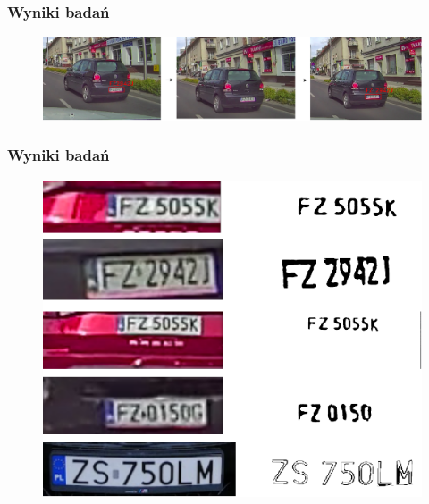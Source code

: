 \documentclass{beamer}
\begin{document}
    \begin{frame}
        \frametitle{Wyniki badań}
        \begin{figure}
            \includegraphics[scale=0.3]{../WIZUT-Dyplom-styl/Pictures/same_car}
        \end{figure}
    \end{frame}

    \begin{frame}
        \frametitle{Wyniki badań}
        \begin{figure}
            \includegraphics[scale=0.3]{../WIZUT-Dyplom-styl/Pictures/plates}
        \end{figure}
    \end{frame}
\end{document}
